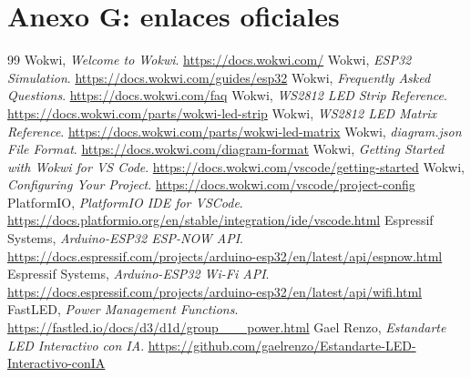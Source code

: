 \documentclass[11pt,a4paper]{article}
\begin{document}
\section{Anexo G: enlaces oficiales}
\begin{thebibliography}{99}
 Wokwi, \textit{Welcome to Wokwi}. \url{https://docs.wokwi.com/}
 Wokwi, \textit{ESP32 Simulation}. \url{https://docs.wokwi.com/guides/esp32}
 Wokwi, \textit{Frequently Asked Questions}. \url{https://docs.wokwi.com/faq}
 Wokwi, \textit{WS2812 LED Strip Reference}. \url{https://docs.wokwi.com/parts/wokwi-led-strip}
 Wokwi, \textit{WS2812 LED Matrix Reference}. \url{https://docs.wokwi.com/parts/wokwi-led-matrix}
 Wokwi, \textit{diagram.json File Format}. \url{https://docs.wokwi.com/diagram-format}
 Wokwi, \textit{Getting Started with Wokwi for VS Code}. \url{https://docs.wokwi.com/vscode/getting-started}
 Wokwi, \textit{Configuring Your Project}. \url{https://docs.wokwi.com/vscode/project-config}
 PlatformIO, \textit{PlatformIO IDE for VSCode}. \url{https://docs.platformio.org/en/stable/integration/ide/vscode.html}
 Espressif Systems, \textit{Arduino-ESP32 ESP-NOW API}. \url{https://docs.espressif.com/projects/arduino-esp32/en/latest/api/espnow.html}
 Espressif Systems, \textit{Arduino-ESP32 Wi-Fi API}. \url{https://docs.espressif.com/projects/arduino-esp32/en/latest/api/wifi.html}
 FastLED, \textit{Power Management Functions}. \url{https://fastled.io/docs/d3/d1d/group___power.html}
 Gael Renzo, \textit{Estandarte LED Interactivo con IA}. \url{https://github.com/gaelrenzo/Estandarte-LED-Interactivo-conIA}
\end{thebibliography}
\end{document}
